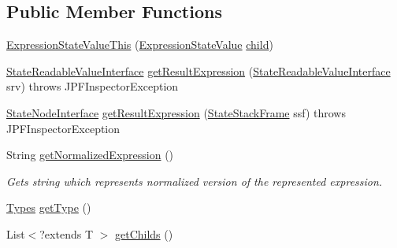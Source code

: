 \subsection*{Public Member Functions}
\begin{DoxyCompactItemize}
\item 
\hyperlink{classgov_1_1nasa_1_1jpf_1_1inspector_1_1server_1_1expression_1_1expressions_1_1_expression_state_value_this_aa95e517a469d73d7f8acf43a9b5b71c1}{Expression\+State\+Value\+This} (\hyperlink{classgov_1_1nasa_1_1jpf_1_1inspector_1_1server_1_1expression_1_1expressions_1_1_expression_state_value}{Expression\+State\+Value} \hyperlink{classgov_1_1nasa_1_1jpf_1_1inspector_1_1server_1_1expression_1_1_expression_state_unary_operator_a66041b1f569a361549e28a00f7ca5f2f}{child})
\item 
\hyperlink{interfacegov_1_1nasa_1_1jpf_1_1inspector_1_1server_1_1programstate_1_1_state_readable_value_interface}{State\+Readable\+Value\+Interface} \hyperlink{classgov_1_1nasa_1_1jpf_1_1inspector_1_1server_1_1expression_1_1expressions_1_1_expression_state_value_this_a354189c15db021ed121c9e0c435683b3}{get\+Result\+Expression} (\hyperlink{interfacegov_1_1nasa_1_1jpf_1_1inspector_1_1server_1_1programstate_1_1_state_readable_value_interface}{State\+Readable\+Value\+Interface} srv)  throws J\+P\+F\+Inspector\+Exception 
\item 
\hyperlink{interfacegov_1_1nasa_1_1jpf_1_1inspector_1_1server_1_1programstate_1_1_state_node_interface}{State\+Node\+Interface} \hyperlink{classgov_1_1nasa_1_1jpf_1_1inspector_1_1server_1_1expression_1_1expressions_1_1_expression_state_value_this_a8099784222fa8e02fdfdfe63521e30e9}{get\+Result\+Expression} (\hyperlink{classgov_1_1nasa_1_1jpf_1_1inspector_1_1server_1_1programstate_1_1_state_stack_frame}{State\+Stack\+Frame} ssf)  throws J\+P\+F\+Inspector\+Exception 
\item 
String \hyperlink{classgov_1_1nasa_1_1jpf_1_1inspector_1_1server_1_1expression_1_1expressions_1_1_expression_state_value_this_af1b579832ec3891431184154c683194a}{get\+Normalized\+Expression} ()
\begin{DoxyCompactList}\small\item\em Gets string which represents normalized version of the represented expression. \end{DoxyCompactList}\item 
\hyperlink{enumgov_1_1nasa_1_1jpf_1_1inspector_1_1server_1_1expression_1_1_types}{Types} \hyperlink{classgov_1_1nasa_1_1jpf_1_1inspector_1_1server_1_1expression_1_1expressions_1_1_expression_state_value_a9317f49f60c166a2f46f90702e75f22e}{get\+Type} ()
\item 
List$<$?extends T $>$ \hyperlink{classgov_1_1nasa_1_1jpf_1_1inspector_1_1server_1_1expression_1_1_expression_state_unary_operator_ad010bcb9c4e2eb584321b5ceba8e1682}{get\+Childs} ()
\end{DoxyCompactItemize}
